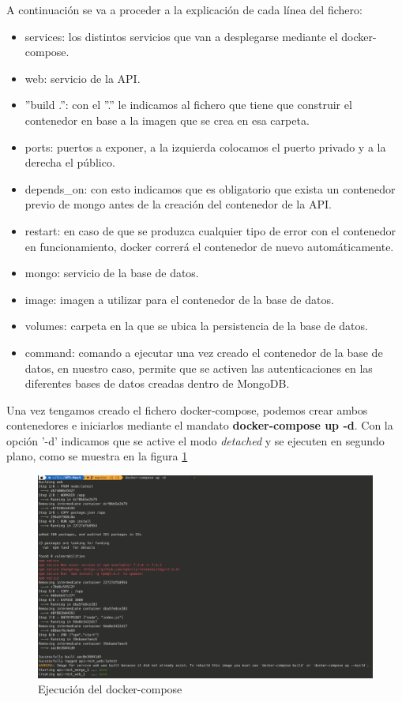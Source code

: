 A continuación se va a proceder a la explicación de cada línea del fichero:

\begin{itemize}
    \item services: los distintos servicios que van a desplegarse mediante el docker-compose.
    \item web: servicio de la API.
    \item ''build .'': con el ''.'' le indicamos al fichero que tiene que construir el contenedor en base a la imagen que se crea en esa carpeta. 
    \item ports: puertos a exponer, a la izquierda colocamos el puerto privado y a la derecha el público.
    \item depends\_on: con esto indicamos que es obligatorio que exista un contenedor previo de mongo antes de la creación del contenedor de la API.
    \item restart: en caso de que se produzca cualquier tipo de error con el contenedor en funcionamiento, docker correrá el contenedor de nuevo automáticamente.
    \item mongo: servicio de la base de datos.
    \item image: imagen a utilizar para el contenedor de la base de datos.
    \item volumes: carpeta en la que se ubica la persistencia de la base de datos.
    \item command: comando a ejecutar una vez creado el contenedor de la base de datos, en nuestro caso, permite que se activen las autenticaciones en las diferentes bases de datos creadas dentro de MongoDB.
\end{itemize}

Una vez tengamos creado el fichero docker-compose, podemos crear ambos contenedores e iniciarlos mediante el mandato \textbf{docker-compose up -d}. Con la opción '-d' indicamos que se active el modo \textit{detached} y se ejecuten en segundo plano, como se muestra en la figura \ref{fig:dockerCompose}

\begin{figure}[H]
    \centering
    \includegraphics[width=\textwidth]{include/capturas/DockerComposeUp.png}
    \caption{Ejecución del docker-compose}
    \label{fig:dockerCompose}
\end{figure}
